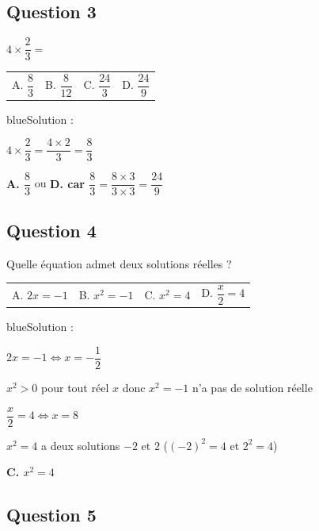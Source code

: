 \documentclass[10pt]{article}
\begin{document}
\subsection*{Question 3}

$4\times\dfrac{2}{3}=$
\begin{center}
\begin{tabularx}{.92\linewidth}{XXXX} A. $\dfrac{8}{3}$ & B. $\dfrac{8}{12}$ & C. $\dfrac{24}{3}$ & D. $\dfrac{24}{9}$\end{tabularx}
\end{center}

\begin{color}{blue}Solution :\par
$4\times\dfrac{2}{3} = \dfrac{4\times 2}{3} = \dfrac{8}{3}$

\textbf{A. $\dfrac{8}{3}$} ou \textbf{D. car $\dfrac{8}{3} = \dfrac{8\times 3}{3\times 3} = \dfrac{24}{9}$}
\end{color}

\subsection*{Question 4}

Quelle équation admet deux solutions réelles ?
\begin{center}
\begin{tabularx}{.92\linewidth}{XXXX} A. $2x=-1$ & B. $x^2=-1$ & C. $x^2=4$ & D. $\dfrac{x}{2}=4$\end{tabularx}
\end{center}

\begin{color}{blue}Solution :\par
$2x=-1 \iff x=-\dfrac{1}{2}$

$x^2>0$ pour tout réel $x$ donc $x^2=-1$ n'a pas de solution réelle

$\dfrac{x}{2}=4\iff x=8$

$x^2=4$ a deux solutions $-2$ et $2$ ($(-2)^2 = 4$ et $2^2 = 4$)

\textbf{C. $x^2=4$}
\end{color}


\subsection*{Question 5}

\begin{center}
\end{center}
\end{document}

